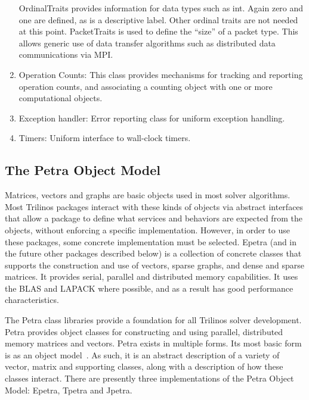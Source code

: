 \documentclass[acmtoms,acmnow]{acmtrans2m}
\begin{document}
\begin{enumerate}
OrdinalTraits provides information for data types such as int.  Again
zero and one are defined, as is a descriptive label.  Other ordinal traits are
not needed at this point.  PacketTraits is used to define the ``size''
of a packet type.  This
allows generic use of data transfer algorithms such as
distributed data communications via MPI.

\item Operation Counts: This class provides mechanisms for tracking
and reporting operation counts, and associating a counting object with
one or more computational objects.

\item Exception handler:  Error reporting class for uniform exception
handling.

\item Timers:  Uniform interface to wall-clock timers.

\end{enumerate}


\subsection{The Petra Object Model}
\label{subsect:PetraObjectModel}

Matrices, vectors and graphs are basic objects used in most solver
algorithms. Most Trilinos
packages interact with these kinds of objects via abstract interfaces that
allow a package to define what services and behaviors are expected from 
the objects,
without enforcing a specific implementation.  However, in order to use
these packages, some concrete
implementation must be selected.  Epetra (and in the future other 
packages described
below) is a collection of concrete
classes that supports the construction and use of vectors, sparse
graphs, and dense and sparse matrices.  It provides serial, parallel and
 distributed memory
capabilities.  It uses the BLAS and LAPACK where possible, and as a
result has good performance characteristics.

The Petra class libraries provide a
foundation for all Trilinos solver development.  Petra provides 
object classes for
constructing and using parallel, distributed memory matrices and vectors.  
Petra exists in
multiple forms.  Its most basic form is as an object 
model~\cite{HeroHoekWill2002}.
As such, it is an abstract 
description of a variety of vector, matrix and supporting classes, along with a 
description of
how these classes interact.  There are presently three implementations
of the Petra Object Model: Epetra, Tpetra and Jpetra.
\end{document}
